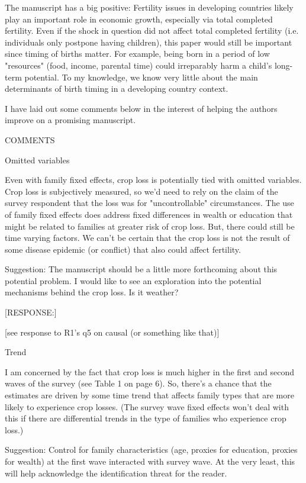 \documentclass[letterpaper,12pt]{article}
\begin{document}
The manuscript has a big positive: Fertility issues in developing
countries likely play an important role in economic growth, especially
via total completed fertility. Even if the shock in question did not
affect total completed fertility (i.e. individuals only postpone having
children), this paper would still be important since timing of births
matter. For example, being born in a period of low "resources" (food,
income, parental time) could irreparably harm a child's long-term
potential. To my knowledge, we know very little about the main
determinants of birth timing in a developing country context.

I have laid out some comments below in the interest of helping the
authors improve on a promising manuscript.


COMMENTS

\begin{description}

\item Omitted variables

Even with family fixed effects, crop loss is potentially tied with
omitted variables. Crop loss is subjectively measured, so we'd need to
rely on the claim of the survey respondent that the loss was for
"uncontrollable" circumstances. The use of family fixed effects does
address fixed differences in wealth or education that might be related
to families at greater risk of crop loss. But, there could still be time
varying factors. We can't be certain that the crop loss is not the
result of some disease epidemic (or conflict) that also could affect
fertility.

Suggestion: The manuscript should be a little more forthcoming about
this potential problem. I would like to see an exploration into the
potential mechanisms behind the crop loss. Is it weather?

[RESPONSE:]

[see response to R1's q5 on causal (or something like that)]

\item Trend

I am concerned by the fact that crop loss is much higher in the first
and second waves of the survey (see Table 1 on page 6). So, there's a
chance that the estimates are driven by some time trend that affects
family types that are more likely to experience crop losses. (The survey
wave fixed effects won't deal with this if there are differential trends
in the type of families who experience crop loss.)

Suggestion: Control for family characteristics (age, proxies for
education, proxies for wealth) at the first wave interacted with survey
wave. At the very least, this will help acknowledge the identification
threat for the reader.



\end{description}
\end{document}
